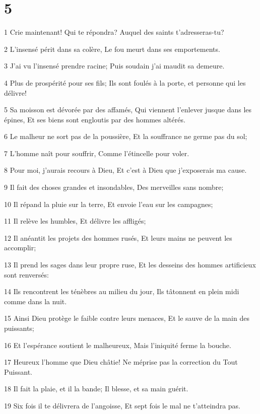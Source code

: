 \chapter{5}

\par 1 Crie maintenant! Qui te répondra? Auquel des saints t'adresseras-tu?
\par 2 L'insensé périt dans sa colère, Le fou meurt dans ses emportements.
\par 3 J'ai vu l'insensé prendre racine; Puis soudain j'ai maudit sa demeure.
\par 4 Plus de prospérité pour ses fils; Ils sont foulés à la porte, et personne qui les délivre!
\par 5 Sa moisson est dévorée par des affamés, Qui viennent l'enlever jusque dans les épines, Et ses biens sont engloutis par des hommes altérés.
\par 6 Le malheur ne sort pas de la poussière, Et la souffrance ne germe pas du sol;
\par 7 L'homme naît pour souffrir, Comme l'étincelle pour voler.
\par 8 Pour moi, j'aurais recours à Dieu, Et c'est à Dieu que j'exposerais ma cause.
\par 9 Il fait des choses grandes et insondables, Des merveilles sans nombre;
\par 10 Il répand la pluie sur la terre, Et envoie l'eau sur les campagnes;
\par 11 Il relève les humbles, Et délivre les affligés;
\par 12 Il anéantit les projets des hommes rusés, Et leurs mains ne peuvent les accomplir;
\par 13 Il prend les sages dans leur propre ruse, Et les desseins des hommes artificieux sont renversés:
\par 14 Ils rencontrent les ténèbres au milieu du jour, Ils tâtonnent en plein midi comme dans la nuit.
\par 15 Ainsi Dieu protège le faible contre leurs menaces, Et le sauve de la main des puissants;
\par 16 Et l'espérance soutient le malheureux, Mais l'iniquité ferme la bouche.
\par 17 Heureux l'homme que Dieu châtie! Ne méprise pas la correction du Tout Puissant.
\par 18 Il fait la plaie, et il la bande; Il blesse, et sa main guérit.
\par 19 Six fois il te délivrera de l'angoisse, Et sept fois le mal ne t'atteindra pas.
